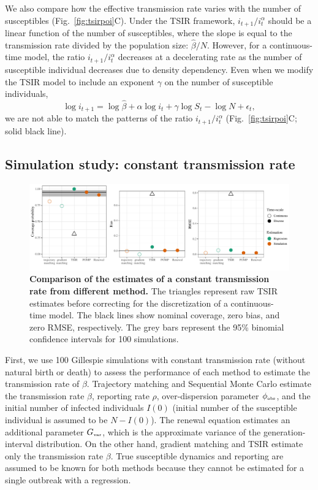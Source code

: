 \documentclass{article}
\newcommand{\fref}[1]{Fig.~\ref{fig:#1}}
\newcommand{\tsub}[2]{#1_{{\textrm{\tiny #2}}}}
\begin{document}
We also compare how the effective transmission rate varies with the number of susceptibles (\fref{tsirpoi}C).
Under the TSIR framework, $i_{t+1}/i_t^\alpha$ should be a linear function of the number of susceptibles, where the slope is equal to the transmission rate divided by the population size: $\hat{\beta}/N$.
However, for a continuous-time model, the ratio $i_{t+1}/i_t^\alpha$ decreases at a decelerating rate as the number of susceptible individual decreases due to density dependency.
Even when we modify the TSIR model to include an exponent $\gamma$ on the number of susceptible individuals,
\begin{equation}
\log i_{t+1} = \log \hat{\beta} + \alpha \log i_t + \gamma \log S_t - \log N + \epsilon_t,
\end{equation}
we are not able to match the patterns of the ratio $i_{t+1}/i_t^\alpha$ (\fref{tsirpoi}C; solid black line).

\subsection{Simulation study: constant transmission rate}

\begin{figure}[!t]
\includegraphics[width=\textwidth]{../figure/compare_estimate_sir.pdf}
\caption{
\textbf{Comparison of the estimates of a constant transmission rate from different method.}
The triangles represent raw TSIR estimates before correcting for the discretization of a continuous-time model.
The black lines show nominal coverage, zero bias, and zero RMSE, respectively.
The grey bars represent the 95\% binomial confidence intervals for 100 simulations.
}
\label{fig:coverage}
\end{figure}

First, we use 100 Gillespie simulations with constant transmission rate (without natural birth or death) to assess the performance of each method to estimate the transmission rate of $\beta$.
Trajectory matching and Sequential Monte Carlo estimate the transmission rate $\beta$, reporting rate $\rho$, over-dispersion parameter $\tsub{\phi}{obs}$, and the initial number of infected individuals $I(0)$ (initial number of the susceptible individual is assumed to be $N - I(0)$).
The renewal equation estimates an additional parameter $\tsub{G}{var}$, which is the approximate variance of the generation-interval distribution.
On the other hand, gradient matching and TSIR estimate only the transmission rate $\beta$.
True susceptible dynamics and reporting are assumed to be known for both methods because they cannot be estimated for a single outbreak with a regression.
\end{document}
